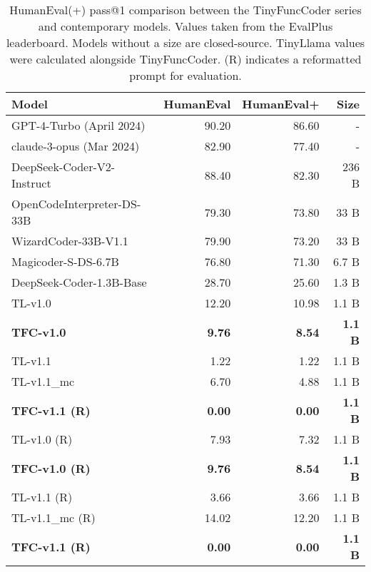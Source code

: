 \begin{table}[!h]
    \centering
    \caption{HumanEval(+) pass@1 comparison between the TinyFuncCoder series and contemporary models. Values taken from the EvalPlus leaderboard. Models without a size are closed-source. TinyLlama values were calculated alongside TinyFuncCoder. (R) indicates a reformatted prompt for evaluation.}
    \begin{tabular}{l|rr|r}
        \hline
        Model & HumanEval & HumanEval+ & Size \\
        \hline
        GPT-4-Turbo (April 2024) & 90.20 & 86.60 & - \\ claude-3-opus (Mar 2024) & 82.90 & 77.40 & - \\
        \hline
        DeepSeek-Coder-V2-Instruct & 88.40 & 82.30 & 236 B \\
        OpenCodeInterpreter-DS-33B & 79.30 & 73.80 & 33 B \\
        WizardCoder-33B-V1.1 & 79.90 & 73.20 & 33 B \\
        Magicoder-S-DS-6.7B & 76.80 & 71.30 & 6.7 B \\
        DeepSeek-Coder-1.3B-Base & 28.70 & 25.60 & 1.3 B \\
        \hline
        TL-v1.0 & 12.20 & 10.98 & 1.1 B \\
        \textbf{TFC-v1.0} & \textbf{9.76} & \textbf{8.54} & \textbf{1.1 B} \\
        TL-v1.1 & 1.22 & 1.22 & 1.1 B \\
        TL-v1.1\_mc & 6.70 & 4.88 & 1.1 B \\
        \textbf{TFC-v1.1 (R)} & \textbf{0.00} & \textbf{0.00} & \textbf{1.1 B} \\
        \hline
        TL-v1.0 (R) & 7.93 & 7.32 & 1.1 B \\
        \textbf{TFC-v1.0 (R)} & \textbf{9.76} & \textbf{8.54} & \textbf{1.1 B} \\
        TL-v1.1 (R) & 3.66 & 3.66 & 1.1 B \\
        TL-v1.1\_mc (R) & 14.02 & 12.20 & 1.1 B \\
        \textbf{TFC-v1.1 (R)} & \textbf{0.00} & \textbf{0.00} & \textbf{1.1 B} \\
        \hline
    \end{tabular}
    \label{tab:humaneval}
\end{table}

